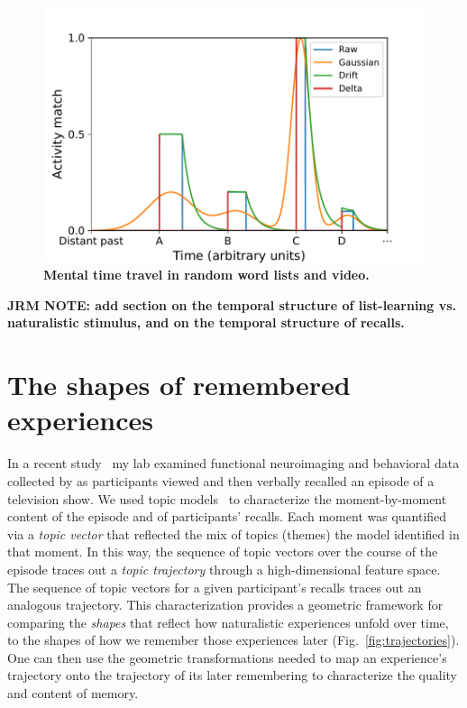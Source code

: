 \documentclass{article}
\begin{document}
\begin{figure}[tp] \centering \includegraphics[width=\textwidth]{figs/reinstatement} \caption{\textbf{Mental time travel in random word lists and video.}  }
\label{fig:reinstatement}
\end{figure}

\textbf{JRM NOTE: add section on the temporal structure of list-learning vs. naturalistic stimulus, and on the temporal structure of recalls.}

\section*{The shapes of remembered experiences}
In a recent study~\citep{HeusEtal18c} my lab examined functional neuroimaging and behavioral data collected by \cite{ChenEtal17} as participants viewed and then verbally recalled an episode of a television show.  We used topic models~\citep{BleiEtal03} to characterize the moment-by-moment content of the episode and of participants' recalls.  Each moment was quantified via a \textit{topic vector} that reflected the mix of topics (themes) the model identified in that moment.  In this way, the sequence of topic vectors over the course of the episode traces out a \textit{topic trajectory} through a high-dimensional feature space.  The sequence of topic vectors for a given participant's recalls traces out an analogous trajectory.  This characterization provides a geometric framework for comparing the \textit{shapes} that reflect how naturalistic experiences unfold over time, to the shapes of how we remember those experiences later (Fig.~\ref{fig:trajectories}).  One can then use the geometric transformations needed to map an experience's trajectory onto the trajectory of its later remembering to characterize the quality and content of memory.
\end{document}
